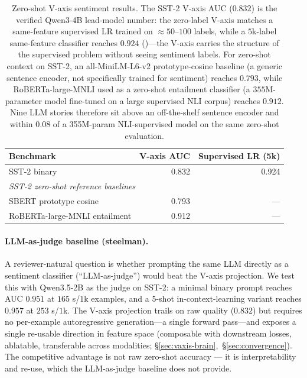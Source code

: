 \begin{table}[h]
\centering
\small
\begin{tabular}{lrr}
\toprule
Benchmark & V-axis AUC & Supervised LR (5k) \\
\midrule
SST-2 binary \citep{socher2013recursive}      & 0.832 & 0.924 \\
\midrule
\multicolumn{3}{l}{\textit{SST-2 zero-shot reference baselines}} \\
SBERT prototype cosine \citep{reimers2019sbert} & 0.793 & --- \\
RoBERTa-large-MNLI entailment \citep{liu2019roberta} & 0.912 & --- \\
\bottomrule
\end{tabular}
\caption{Zero-shot V-axis sentiment results. The SST-2 V-axis AUC
($0.832$) is the verified Qwen3-4B lead-model number: the zero-label
V-axis matches a same-feature supervised LR trained on ${\approx}50$--$100$
labels, while a $5$k-label same-feature classifier reaches $0.924$
()---the V-axis carries the structure of the
supervised problem without seeing sentiment labels.
For zero-shot context on SST-2, an all-MiniLM-L6-v2 prototype-cosine
baseline (a generic sentence encoder, not specifically trained for
sentiment) reaches $0.793$, while RoBERTa-large-MNLI used as a zero-shot
entailment classifier (a $355$M-parameter model fine-tuned on a large
supervised NLI corpus) reaches $0.912$. Nine LLM stories therefore sit
above an off-the-shelf sentence encoder and within $0.08$ of a
355M-param NLI-supervised model on the same zero-shot evaluation.}
\label{tab:vaxis-sentiment}
\end{table}

\paragraph{LLM-as-judge baseline (steelman).} A reviewer-natural
question is whether prompting the same LLM directly as a sentiment
classifier (``LLM-as-judge'') would beat the V-axis projection. We
test this with Qwen3.5-2B as the judge on SST-2: a minimal binary
prompt reaches AUC $0.951$ at $165$ s/$1$k examples, and a 5-shot
in-context-learning variant reaches $0.957$ at $253$ s/$1$k. The
V-axis projection trails on raw quality ($0.832$) but requires no
per-example autoregressive generation---a single forward pass---and
exposes a single re-usable direction in feature space (composable
with downstream losses, ablatable, transferable across modalities;
\S\ref{sec:vaxis-brain},~\S\ref{sec:convergence}). The competitive
advantage is not raw zero-shot accuracy --- it is interpretability
and re-use, which the LLM-as-judge baseline does not provide.

